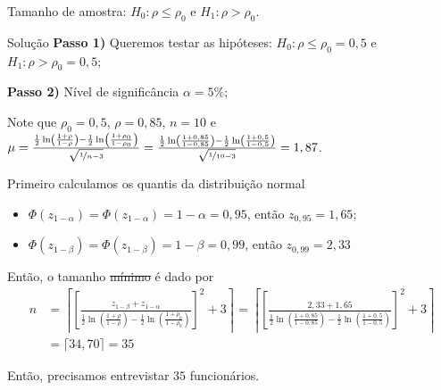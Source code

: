 \documentclass[9pt]{beamer}
\begin{document}
\begin{frame}{Tamanho de amostra: $H_0:\rho \leq \rho_0$ e $H_1: \rho > \rho_0$.}

\small
\begin{block}{Solução}
	\textbf{Passo 1)} Queremos testar as hipóteses: $H_0: \rho \leq \rho_0= 0,5$ e $H_1:\rho > \rho_0= 0,5$;

	\textbf{Passo 2)} Nível de significância $\alpha=5\%$;
	
	Note que $\rho_0 = 0,5$, $\rho = 0,85$, $n = 10$ e $\mu = \frac{ \frac{1}{2} \ln\left( \frac{1 + \rho}{1 - \rho} \right) -\frac{1}{2} \ln\left( \frac{1 + \rho_0}{1 - \rho_0} \right)  }{\sqrt{\nicefrac{1}{n-3}}} = \allowbreak \frac{ \frac{1}{2} \ln\left( \frac{1 + 0,85}{1 - 0,85} \right) -\frac{1}{2} \ln\left( \frac{1 + 0,5}{1 - 0,5} \right)  }{\sqrt{\nicefrac{1}{10-3}}} = 1,87$.
	
	Primeiro calculamos os quantis da distribuição normal
	\begin{itemize}
		\item $\Phi\left( z_{1-\alpha} \right) = \Phi\left( z_{1-\alpha} \right) = 1 - \alpha = 0,95$, então $z_{0,95} = 1,65$;
		\item $\Phi\left( z_{1-\beta} \right) = \Phi\left( z_{1-\beta} \right) = 1 - \beta = 0,99$, então $z_{0,99} = 2,33$ 
	\end{itemize}
	
	Então, o tamanho \sout{mínimo} é dado por
	\begin{align*}
		n &= \left\lceil \left[ \frac{z_{1-\beta} + z_{1-\alpha}}{ \frac{1}{2} \ln \left( \frac{1 + \rho}{1 - \rho} \right) - \frac{1}{2} \ln \left( \frac{1 + \rho_0}{1 - \rho_0} \right) } \right]^2 + 3 \right\rceil = \left\lceil \left[ \frac{2,33 + 1,65}{\frac{1}{2} \ln \left( \frac{1 + 0,85}{1 - 0,85} \right) - \frac{1}{2} \ln \left( \frac{1 + 0,5}{1 - 0,5} \right)} \right]^2 + 3 \right\rceil\\
		&= \lceil 34,70 \rceil = 35
	\end{align*}	
	
	Então, precisamos entrevistar $35$ funcionários.
\end{block}
\normalsize
\end{frame}
\end{document}
